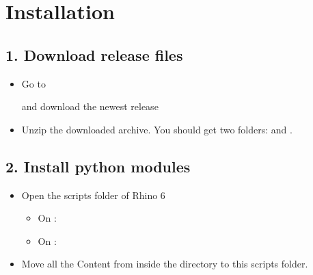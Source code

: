 \documentclass[letterpaper,10pt,english]{sphinxmanual}
\begin{document}
\section{Installation}
\label{\detokenize{README:installation}}

\subsection{1. Download release files}
\label{\detokenize{README:download-release-files}}\label{\detokenize{README:id2}}\begin{itemize}
\item {} 
Go to %
\begin{footnote}[32]\sphinxAtStartFootnote
{}
%
\end{footnote} and
download the newest release

\item {} 
Unzip the downloaded archive. You should get two folders: 
and .

\end{itemize}


\subsection{2. Install python modules}
\label{\detokenize{README:install-python-modules}}\label{\detokenize{README:id3}}\begin{itemize}
\item {} 
Open the scripts folder of Rhino 6
\begin{itemize}
\item {} 
On :

\item {} 
On :

\end{itemize}

\item {} 
Move all the Content from inside the  directory to this
scripts folder.

\end{itemize}
\end{document}
